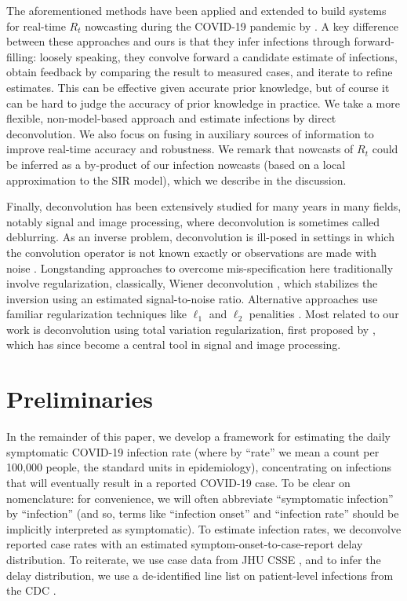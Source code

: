 \documentclass[sts]{imsart}
\theoremstyle{plain}
\theoremstyle{definition}
\theoremstyle{remark}
\begin{document}
The aforementioned methods have been applied and extended to build systems for
real-time $R_t$ nowcasting during the COVID-19 pandemic by \citet{Abbott:2020,
  rtlive, Chitwood:2021}. A key difference between these approaches and ours is 
that they infer infections through forward-filling: loosely speaking, they
convolve forward a candidate estimate of infections, obtain feedback by
comparing the result to measured cases, and iterate to refine estimates. This
can be effective given accurate prior knowledge, but of course it can be hard to
judge the accuracy of prior knowledge in practice. We take a more flexible,
non-model-based approach and estimate infections by direct deconvolution. We
also focus on fusing in auxiliary sources of information to improve real-time
accuracy and robustness. We remark that nowcasts of $R_t$ could be inferred as a
by-product of our infection nowcasts (based on a local approximation to the SIR
model), which we describe in the discussion.

Finally, deconvolution has been extensively studied for many years in many
fields, notably signal and image processing, where deconvolution is sometimes
called deblurring. As an inverse problem, deconvolution is ill-posed in
settings in which the convolution operator is not known exactly or observations are
made with noise \citep{Oppenheim:2017}. Longstanding approaches to overcome
mis-specification here traditionally involve regularization, 
classically, Wiener deconvolution \citep{Wiener:1964}, which stabilizes the
inversion using an estimated signal-to-noise ratio. Alternative approaches use
familiar regularization techniques like $\ell_1$ and $\ell_2$ penalities
\citep{Taylor:1979, Debeye:1990}. Most related to our work is deconvolution
using total variation regularization, first proposed by \citet{Rudin:1994},
which has since become a central tool in signal and image processing. 

\section{Preliminaries}
\label{sec:preliminaries}

In the remainder of this paper, we develop a framework for estimating the daily
symptomatic COVID-19 infection rate (where by ``rate'' we mean a count per
100,000 people, the standard units in epidemiology), concentrating on infections
that will eventually result in a reported COVID-19 case. To be clear on
nomenclature: for convenience, we will often abbreviate ``symptomatic
infection'' by ``infection'' (and so, terms like ``infection onset'' and
``infection rate'' should be implicitly interpreted as symptomatic). To
estimate infection rates, we deconvolve reported case rates with an estimated
symptom-onset-to-case-report delay distribution. To reiterate, we use case data
from JHU CSSE \citep{Dong:2020}, and to infer the delay distribution, we use a
de-identified line list on patient-level infections from the CDC
\citep{cdc_public}. 
\end{document}
